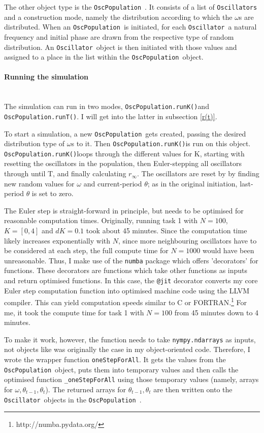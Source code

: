 \documentclass[11pt,a4paper]{article}
\newcommand{\graph}{\medskip\noindent}
\newcommand{\osc}{\texttt{Oscillator}~}
\newcommand{\oscpop}{\texttt{OscPopulation}~}
\newcommand{\runK}{\mbox{\texttt{OscPopulation.runK()}}}
\newcommand{\runT}{\mbox{\texttt{OscPopulation.runT()}}}
\newcommand{\code}[1]{\texttt{#1}}
\newcommand{\para}[1]{\paragraph{#1}\mbox{}\\}
\begin{document}
The other object type is the \oscpop. 
It consists of a list of \code{Oscillators} and a construction mode, namely the distribution according to which the $\omega$s are distributed.
When an \oscpop is initiated, for each \osc a natural frequency and initial phase are drawn from the respective type of random distribution. 
An \osc object is then initiated with those values and assigned to a place in the list within the \oscpop object.


\para{Running the simulation}
The simulation can run in two modes, \runK and \runT. 
I will get into the latter in subsection \ref{r(t)}.

To start a simulation, a new \oscpop gets created, passing the desired distribution type of $\omega$s to it.
Then \runK is run on this object.
\runK loops through the different values for K, starting with resetting the oscillators in the population, then Euler-stepping all oscillators through until T, and finally calculating $r_\infty$. 
The oscillators are reset by by finding new random values for $\omega$ and current-period $\theta$; as in the original initiation, last-period $\theta$ is set to zero.

\graph
The Euler step is straight-forward in principle, but needs to be optimised for reasonable computation times. 
Originally, running task 1 with $ N = 100$, $K = [0, 4]$ and $dK = 0.1$ took about 45 minutes. 
Since the computation time likely increases exponentially with $N$, since more neighbouring oscillators have to be considered at each step, the full compute time for $N=1000$ would have been unreasonable. 
Thus, I make use of the \code{numba} package which offers 'decorators' for functions. 
These decorators are functions which take other functions as inputs and return optimised functions.
In this case, the \code{@jit} decorator converts my core Euler step computation function into optimised machine code using the LLVM compiler. 
This can yield computation speeds similar to C or FORTRAN.\footnote{http://numba.pydata.org/}
For me, it took the compute time for task 1 with $ N = 100$ from 45 minutes down to 4 minutes. 

To make it work, however, the function needs to take \code{nympy.ndarrays} as inputs, not objects like was originally the case in my object-oriented code. 
Therefore, I wrote the wrapper function \code{oneStepForAll}. 
It gets the values from the \oscpop object, puts them into temporary values and then calls the optimised function \code{\_oneStepForAll} using those temporary values (namely, arrays for $\omega, \theta_{t-1}, \theta_{t}$).
The returned arrays for $\theta_{t-1}, \theta_{t}$ are then written onto the \osc objects in the \oscpop. 
\end{document}
